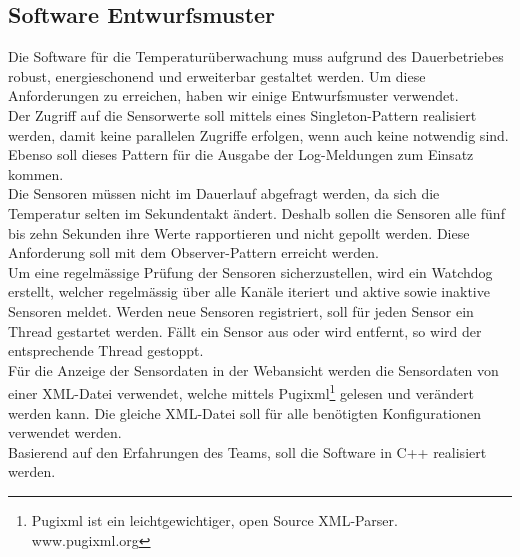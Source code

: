 \subsection{Software Entwurfsmuster}
Die Software für die Temperaturüberwachung muss aufgrund des Dauerbetriebes robust, energieschonend und erweiterbar gestaltet werden. Um diese Anforderungen zu erreichen, haben wir einige Entwurfsmuster verwendet.\\
Der Zugriff auf die Sensorwerte soll mittels eines Singleton-Pattern realisiert werden, damit keine parallelen Zugriffe erfolgen, wenn auch keine notwendig sind. Ebenso soll dieses Pattern für die Ausgabe der Log-Meldungen zum Einsatz kommen.\\
Die Sensoren müssen nicht im Dauerlauf abgefragt werden, da sich die Temperatur selten im Sekundentakt ändert. Deshalb sollen die Sensoren alle fünf bis zehn Sekunden ihre Werte rapportieren und nicht gepollt werden. Diese Anforderung soll mit dem Observer-Pattern erreicht werden.\\
Um eine regelmässige Prüfung der Sensoren sicherzustellen, wird ein Watchdog erstellt, welcher regelmässig über alle Kanäle iteriert und aktive sowie inaktive Sensoren meldet. Werden neue Sensoren registriert, soll für jeden Sensor ein Thread gestartet werden. Fällt ein Sensor aus oder wird entfernt, so wird der entsprechende Thread gestoppt.\\
Für die Anzeige der Sensordaten in der Webansicht werden die Sensordaten von einer XML-Datei verwendet, welche mittels Pugixml\footnote{Pugixml ist ein leichtgewichtiger, open Source XML-Parser. www.pugixml.org} gelesen und verändert werden kann. Die gleiche XML-Datei soll für alle benötigten Konfigurationen verwendet werden.\\
Basierend auf den Erfahrungen des Teams, soll die Software in C++ realisiert werden.
